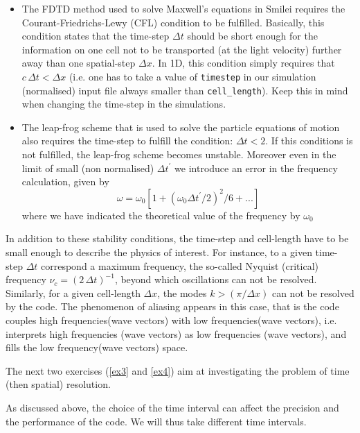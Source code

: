 \documentclass[11pt,a4paper]{article}
\newcommand{\code}[1] {{\color{classcolour}\texttt{#1}}}
\begin{document}
\begin{itemize}
\item The FDTD method used to solve Maxwell's equations in Smilei requires the Courant-Friedrichs-Lewy (CFL) condition to be fulfilled. Basically, this condition states that the time-step $\Delta t$ should be short enough for the information on one cell not to be transported (at the light velocity) further away than one spatial-step $\Delta x$. In 1D, this condition simply requires that $c\,\Delta t < \Delta x$ (i.e. one has to take a value of \code{timestep} in our simulation (normalised) input file always smaller than \code{cell\_length}). Keep this in mind when changing the time-step in the simulations.
\item  The leap-frog scheme that is used to solve the particle equations of motion also requires the time-step to fulfill the condition: $\Delta t < 2$. If this conditions is not fulfilled, the leap-frog scheme becomes unstable.
Moreover even in the limit of small (non normalised) $\Delta t^\prime$ we introduce an error in the frequency calculation, given by 
$$\omega = \omega_0  [1+ (\omega_0 \Delta t^\prime/2 )^2/6+... ]$$
where we have indicated the theoretical value of the frequency  by $\omega_0$
\end{itemize}

In addition to these stability conditions, the time-step and cell-length have to be small enough to describe the physics of interest. For instance, to a given time-step $\Delta t$ correspond a maximum frequency, the so-called Nyquist (critical) frequency $\nu_c =(2\,\Delta t)^{-1}$, beyond which oscillations can not be resolved. Similarly, for a given cell-length $\Delta x$, the modes $k>(\pi/\Delta x)$ can not be resolved by the code.  The phenomenon of aliasing appears in this case, that is the code couples high frequencies(wave vectors)  with low frequencies(wave vectors), i.e. interprets high frequencies (wave vectors) as low frequencies (wave vectors), and fills the low frequency(wave vectors) space. 

The next two exercises (\ref{ex3} and \ref{ex4}) aim at investigating the problem of time (then spatial) resolution. 

As discussed above, the choice of the time interval can affect the precision and the performance of the code. We will thus take different time intervals. 
\end{document}

